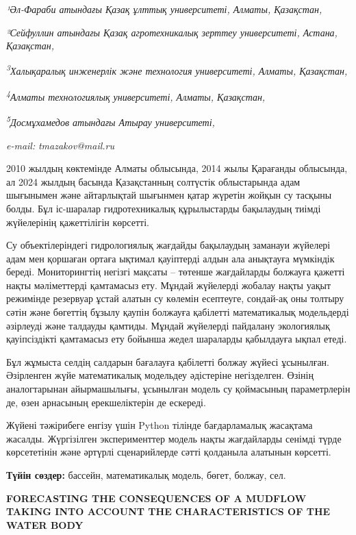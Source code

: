 {\emph{¹Әл-Фараби атындағы Қазақ ұлттық университеті, Алматы, Қазақстан,}

\emph{²Сейфуллин атындағы Қазақ агротехникалық зерттеу университеті,
Астана, Қазақстан,}

\emph{\textsuperscript{3}Халықаралық инженерлік және технология
университеті, Алматы, Қазақстан,}

\emph{\textsuperscript{4}Алматы технологиялық университеті, Алматы,
Қазақстан,}

\emph{\textsuperscript{5}Досмұхамедов атындағы Атырау университеті,}

\emph{e-mail:} \emph{tmazakov@mail.ru}

2010 жылдың көктемінде Алматы облысында, 2014 жылы Қарағанды
\hspace{0pt}\hspace{0pt}облысында, ал 2024 жылдың басында Қазақстанның
солтүстік облыстарында адам шығынымен және айтарлықтай шығынмен қатар
жүретін жойқын су тасқыны болды. Бұл іс-шаралар гидротехникалық
құрылыстарды бақылаудың тиімді жүйелерінің қажеттілігін көрсетті.

Су объектілеріндегі гидрологиялық жағдайды бақылаудың заманауи жүйелері
адам мен қоршаған ортаға ықтимал қауіптерді алдын ала анықтауға
мүмкіндік береді. Мониторингтің негізгі мақсаты -- төтенше жағдайларды
болжауға қажетті нақты мәліметтерді қамтамасыз ету. Мұндай жүйелерді
жобалау нақты уақыт режимінде резервуар ұстай алатын су көлемін
есептеуге, сондай-ақ оны толтыру сәтін және бөгеттің бұзылу қаупін
болжауға қабілетті математикалық модельдерді әзірлеуді және талдауды
қамтиды. Мұндай жүйелерді пайдалану экологиялық қауіпсіздікті қамтамасыз
ету бойынша жедел шараларды қабылдауға ықпал етеді.

Бұл жұмыста селдің салдарын бағалауға қабілетті болжау жүйесі ұсынылған.
Әзірленген жүйе математикалық модельдеу әдістеріне негізделген. Өзінің
аналогтарынан айырмашылығы, ұсынылған модель су қоймасының параметрлерін
де, өзен арнасының ерекшеліктерін де ескереді.

Жүйені тәжірибеге енгізу үшін Python тілінде бағдарламалық жасақтама
жасалды. Жүргізілген эксперименттер модель нақты жағдайларды сенімді
түрде көрсететінін және әртүрлі сценарийлерде сәтті қолданыла алатынын
көрсетті.

{\bfseries Түйін сөздер:} бассейн, математикалық модель, бөгет, болжау,
сел.

{\bfseries FORECASTING THE CONSEQUENCES OF A MUDFLOW TAKING INTO ACCOUNT
THE CHARACTERISTICS OF THE WATER BODY}

}

